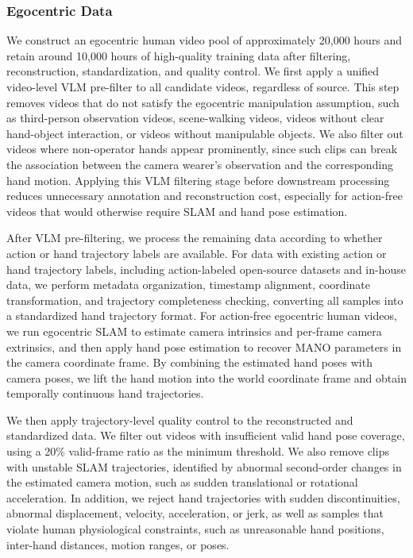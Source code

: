 \subsubsection{Egocentric Data}

We construct an egocentric human video pool of approximately 20,000 hours and retain around 10,000 hours of high-quality training data after filtering, reconstruction, standardization, and quality control. 
We first apply a unified video-level VLM pre-filter to all candidate videos, regardless of source. This step removes videos that do not satisfy the egocentric manipulation assumption, such as third-person observation videos, scene-walking videos, videos without clear hand-object interaction, or videos without manipulable objects. We also filter out videos where non-operator hands appear prominently, since such clips can break the association between the camera wearer's observation and the corresponding hand motion. Applying this VLM filtering stage before downstream processing reduces unnecessary annotation and reconstruction cost, especially for action-free videos that would otherwise require SLAM and hand pose estimation.

After VLM pre-filtering, we process the remaining data according to whether action or hand trajectory labels are available. For data with existing action or hand trajectory labels, including action-labeled open-source datasets and in-house data, we perform metadata organization, timestamp alignment, coordinate transformation, and trajectory completeness checking, converting all samples into a standardized hand trajectory format. For action-free egocentric human videos, we run egocentric SLAM to estimate camera intrinsics and per-frame camera extrinsics, and then apply hand pose estimation to recover MANO parameters in the camera coordinate frame. By combining the estimated hand poses with camera poses, we lift the hand motion into the world coordinate frame and obtain temporally continuous hand trajectories.

We then apply trajectory-level quality control to the reconstructed and standardized data. We filter out videos with insufficient valid hand pose coverage, using a 20\% valid-frame ratio as the minimum threshold. We also remove clips with unstable SLAM trajectories, identified by abnormal second-order changes in the estimated camera motion, such as sudden translational or rotational acceleration. In addition, we reject hand trajectories with sudden discontinuities, abnormal displacement, velocity, acceleration, or jerk, as well as samples that violate human physiological constraints, such as unreasonable hand positions, inter-hand distances, motion ranges, or poses.

